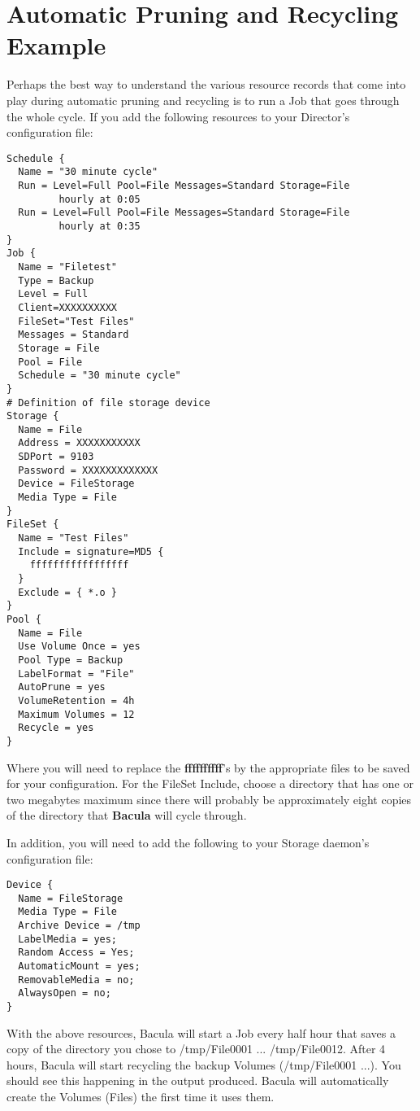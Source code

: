 \section{ Automatic Pruning and Recycling Example}
\label{PruningExample}

Perhaps the best way to understand the various resource records that come into
play during automatic pruning and recycling is to run a Job that goes through
the whole cycle. If you add the following resources to your Director's
configuration file: 

\footnotesize
\begin{verbatim}
Schedule {
  Name = "30 minute cycle"
  Run = Level=Full Pool=File Messages=Standard Storage=File
         hourly at 0:05
  Run = Level=Full Pool=File Messages=Standard Storage=File
         hourly at 0:35
}
Job {
  Name = "Filetest"
  Type = Backup
  Level = Full
  Client=XXXXXXXXXX
  FileSet="Test Files"
  Messages = Standard
  Storage = File
  Pool = File
  Schedule = "30 minute cycle"
}
# Definition of file storage device
Storage {
  Name = File
  Address = XXXXXXXXXXX
  SDPort = 9103
  Password = XXXXXXXXXXXXX
  Device = FileStorage
  Media Type = File
}
FileSet {
  Name = "Test Files"
  Include = signature=MD5 {
    fffffffffffffffff
  }
  Exclude = { *.o }
}
Pool {
  Name = File
  Use Volume Once = yes
  Pool Type = Backup
  LabelFormat = "File"
  AutoPrune = yes
  VolumeRetention = 4h
  Maximum Volumes = 12
  Recycle = yes
}
\end{verbatim}
\normalsize

Where you will need to replace the {\bf ffffffffff}'s by the appropriate files
to be saved for your configuration. For the FileSet Include, choose a
directory that has one or two megabytes maximum since there will probably be
approximately eight copies of the directory that {\bf Bacula} will cycle through. 

In addition, you will need to add the following to your Storage daemon's
configuration file: 

\footnotesize
\begin{verbatim}
Device {
  Name = FileStorage
  Media Type = File
  Archive Device = /tmp
  LabelMedia = yes;
  Random Access = Yes;
  AutomaticMount = yes;
  RemovableMedia = no;
  AlwaysOpen = no;
}
\end{verbatim}
\normalsize

With the above resources, Bacula will start a Job every half hour that saves a
copy of the directory you chose to /tmp/File0001 ... /tmp/File0012. After 4
hours, Bacula will start recycling the backup Volumes (/tmp/File0001 ...). You
should see this happening in the output produced. Bacula will automatically
create the Volumes (Files) the first time it uses them. 

